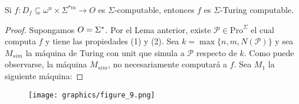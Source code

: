 \begin{frame}
  \begin{theorem}
    Si $f: D_{f} \subseteq \omega^{n} \times \Sigma^{\ast m} \rightarrow O$ es $\Sigma$-computable, entonces $f$ es
    $\Sigma$-Turing computable.
  \end{theorem}

  \begin{proof}
    \PN Supongamos $O = \Sigma^{\ast}$. Por el Lema anterior, existe $\mathcal{P} \in \mathrm{Pro}^{\Sigma}$ el cual computa
    $f$ y tiene las propiedades (1) y (2). Sea $k = \max \{n, m, N(\mathcal{P})\}$ y sea $M_{sim}$ la máquina de Turing
    con unit que simula a $\mathcal{P}$ respecto de $k$. Como puede observarse, la máquina $M_{sim}$, no necesariamente
    computará a $f$. Sea $M_{1}$ la siguiente máquina:
  \end{proof}

  \begin{figure}[h]
    \centering
    \texttt{[image: graphics/figure\_9.png]}
  \end{figure}
\end{frame}

